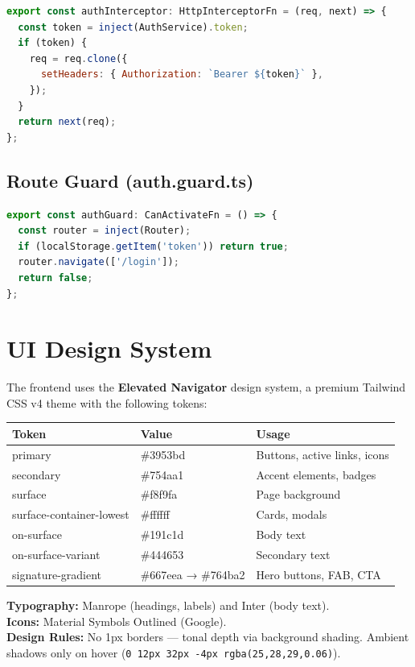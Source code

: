 \documentclass[12pt,a4paper]{article}
\begin{document}
\begin{lstlisting}[language=JavaScript]
export const authInterceptor: HttpInterceptorFn = (req, next) => {
  const token = inject(AuthService).token;
  if (token) {
    req = req.clone({
      setHeaders: { Authorization: `Bearer ${token}` },
    });
  }
  return next(req);
};
\end{lstlisting}

\subsection{Route Guard (auth.guard.ts)}

\begin{lstlisting}[language=JavaScript]
export const authGuard: CanActivateFn = () => {
  const router = inject(Router);
  if (localStorage.getItem('token')) return true;
  router.navigate(['/login']);
  return false;
};
\end{lstlisting}

\section{UI Design System}

The frontend uses the \textbf{Elevated Navigator} design system, a premium Tailwind CSS v4 theme with the following tokens:

\begin{longtable}{>{\ttfamily}p{5cm} p{3cm} p{5cm}}
\toprule
\normalfont\textbf{Token} & \normalfont\textbf{Value} & \normalfont\textbf{Usage} \\
\midrule
\endhead
primary & \#3953bd & Buttons, active links, icons \\
secondary & \#754aa1 & Accent elements, badges \\
surface & \#f8f9fa & Page background \\
surface-container-lowest & \#ffffff & Cards, modals \\
on-surface & \#191c1d & Body text \\
on-surface-variant & \#444653 & Secondary text \\
signature-gradient & \#667eea → \#764ba2 & Hero buttons, FAB, CTA \\
\bottomrule
\end{longtable}

\textbf{Typography:} Manrope (headings, labels) and Inter (body text). \\
\textbf{Icons:} Material Symbols Outlined (Google). \\
\textbf{Design Rules:} No 1px borders — tonal depth via background shading. Ambient shadows only on hover (\texttt{0 12px 32px -4px rgba(25,28,29,0.06)}).
\end{document}
